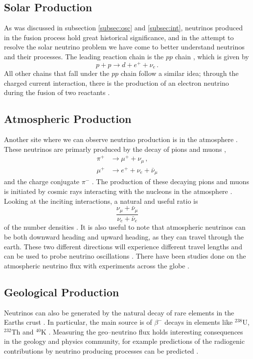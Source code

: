 \subsection{Solar Production}

As was discussed in subsection \ref{subsec:osc} and \ref{subsec:int}, neutrinos produced in the fusion process hold great historical significance, and in the attempt to resolve the solar neutrino problem we have come to better understand neutrinos and their processes. The leading reaction chain is the $pp$ chain \cite{pdg,solar_nu}, which is given by \cite{pdg}
\begin{equation}
  p + p \to d + e^{+} + \nu_{e} \, .
\end{equation}
All other chains that fall under the $pp$ chain follow a similar idea; through the charged current interaction, there is the production of an electron neutrino during the fusion of two reactants \cite{pdg}.

\subsection{Atmospheric Production}\label{subsec:atmos}
Another site where we can observe neutrino production is in the atmosphere \cite{atm_nu,pdg,volk_atm}. These neutrinos are primarly produced by the decay of pions and muons \cite{pdg},
\begin{align}
  \pi^{+} & \to \mu^{+} + \nu_{\mu}\, , \\
  \mu^{+} & \to e^{+} + \nu_{e} + \bar{\nu}_{\mu}
\end{align}
and the charge conjugate $\pi^{-}$ \cite{pdg}. The production of these decaying pions and muons is initiated by cosmic rays interacting with the nucleons in the atmosphere \cite{atm_nu,pdg,volk_atm}. Looking at the inciting interactions, a natural and useful ratio is 
\begin{equation}
  \frac{\nu_{\mu} + \bar{\nu}_{\mu}}{\nu_{e} + \bar{\nu}_{e}}
\end{equation}
of the number densities \cite{pdg}. It is also useful to note that atmospheric neutrinos can be both downward heading and upward heading, as they can travel through the earth. These two different directions will experience different travel lengths and can be used to probe neutrino oscillations \cite{pdg}. There have been studies done on the atmospheric neutrino flux with experiments across the globe \cite{pdg, volk_atm}.

\subsection{Geological Production}
Neutrinos can also be generated by the natural decay of rare elements in the Earths crust \cite{geo_nu}. In particular, the main source is of $\beta^{-}$ decays in elements like $^{238}$U, $^{232}$Th and $^{40}$K \cite{geo_nu}. Measuring the geo--neutrino flux holds interesting consequences in the geology and physics community, for example predictions of the radiogenic contributions by neutrino producing processes can be predicted \cite{geo_nu}.

